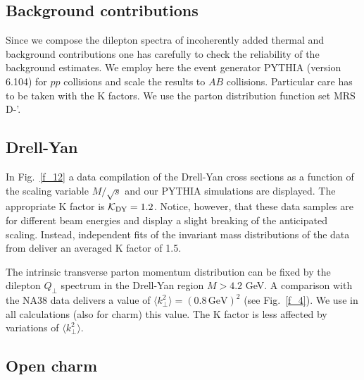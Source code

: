 \begin{appendix}

\section{\label{Appendix A} Background contributions} %

Since we compose the dilepton spectra of incoherently added
thermal and background contributions one has carefully to check
the reliability of the background estimates. We employ here the
event generator PYTHIA \cite{PYTHIA} (version 6.104)
for $pp$ collisions and scale
the results to $AB$ collisions. Particular care has to be taken with
the K factors. We use the parton distribution function set
MRS D-'.

\subsection{\label{Appendix A1} Drell-Yan} %

In Fig.~\ref{f_12} a data compilation of the Drell-Yan cross sections 
\cite{DY_K_factor} as
a function of the scaling variable $M/\sqrt{s}$ and our PYTHIA
simulations are displayed. The appropriate K factor
is ${\cal K}_{\rm DY} = 1.2$.
Notice, however, that these data samples are for different beam
energies and display a slight breaking of the anticipated scaling. 
Instead, independent fits of the invariant mass distributions of
the data from \cite{DY_K_factor,DY_K_factor_2} deliver an averaged
K factor of 1.5.


The intrinsic transverse parton momentum distribution can be fixed
by the dilepton $Q_\perp$ spectrum in the Drell-Yan region
$M > 4.2$ GeV. A comparison with the NA38 data \cite{NA38}
delivers a value of $\langle k_\perp^2 \rangle = (0.8 \, \mbox{GeV})^2$
(see Fig.~\ref{f_4}).
We use in all calculations (also for charm) this value.
The K factor is less affected by variations of  
$\langle k_\perp^2 \rangle$.
 
\subsection{\label{Appendix A2} Open charm} %


\end{appendix}
